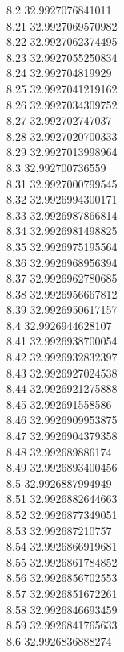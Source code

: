 {8.2	32.9927076841011\\
8.21	32.9927069570982\\
8.22	32.9927062374495\\
8.23	32.9927055250834\\
8.24	32.992704819929\\
8.25	32.9927041219162\\
8.26	32.9927034309752\\
8.27	32.992702747037\\
8.28	32.9927020700333\\
8.29	32.9927013998964\\
8.3	32.992700736559\\
8.31	32.9927000799545\\
8.32	32.9926994300171\\
8.33	32.9926987866814\\
8.34	32.9926981498825\\
8.35	32.9926975195564\\
8.36	32.9926968956394\\
8.37	32.9926962780685\\
8.38	32.9926956667812\\
8.39	32.9926950617157\\
8.4	32.9926944628107\\
8.41	32.9926938700054\\
8.42	32.9926932832397\\
8.43	32.9926927024538\\
8.44	32.9926921275888\\
8.45	32.992691558586\\
8.46	32.9926909953875\\
8.47	32.9926904379358\\
8.48	32.992689886174\\
8.49	32.9926893400456\\
8.5	32.9926887994949\\
8.51	32.9926882644663\\
8.52	32.9926877349051\\
8.53	32.992687210757\\
8.54	32.9926866919681\\
8.55	32.9926861784852\\
8.56	32.9926856702553\\
8.57	32.9926851672261\\
8.58	32.9926846693459\\
8.59	32.9926841765633\\
8.6	32.9926836888274\\
}
